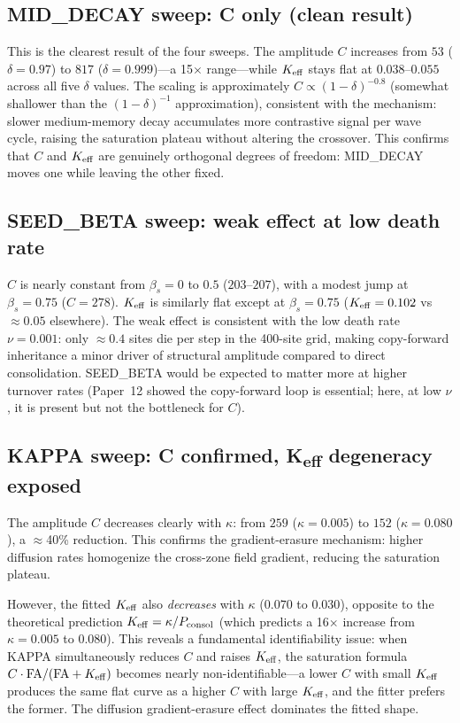 \documentclass[11pt,a4paper]{article}
\begin{document}
\subsection{MID\_DECAY sweep: C only (clean result)}

This is the clearest result of the four sweeps.  The amplitude $C$ increases
from $53$ ($\delta=0.97$) to $817$ ($\delta=0.999$)---a 15$\times$ range---while
$K_{\rm eff}$ stays flat at $0.038$--$0.055$ across all five $\delta$ values.
The scaling is approximately $C\propto(1-\delta)^{-0.8}$ (somewhat shallower than
the $(1-\delta)^{-1}$ approximation), consistent with the mechanism: slower
medium-memory decay accumulates more contrastive signal per wave cycle, raising the
saturation plateau without altering the crossover.  This confirms that $C$ and
$K_{\rm eff}$ are genuinely orthogonal degrees of freedom: MID\_DECAY moves one
while leaving the other fixed.

\subsection{SEED\_BETA sweep: weak effect at low death rate}

$C$ is nearly constant from $\beta_s=0$ to $0.5$ ($203$--$207$), with a modest
jump at $\beta_s=0.75$ ($C=278$).  $K_{\rm eff}$ is similarly flat except at
$\beta_s=0.75$ ($K_{\rm eff}=0.102$ vs $\approx0.05$ elsewhere).  The weak effect
is consistent with the low death rate $\nu=0.001$: only $\approx0.4$ sites die per
step in the 400-site grid, making copy-forward inheritance a minor driver of
structural amplitude compared to direct consolidation.  SEED\_BETA would be expected
to matter more at higher turnover rates (Paper~12 showed the copy-forward loop is
essential; here, at low $\nu$, it is present but not the bottleneck for $C$).

\subsection{KAPPA sweep: C confirmed, K\textsubscript{eff} degeneracy exposed}

The amplitude $C$ decreases clearly with $\kappa$: from $259$ ($\kappa=0.005$) to
$152$ ($\kappa=0.080$), a $\approx$40\% reduction.  This confirms the gradient-erasure
mechanism: higher diffusion rates homogenize the cross-zone field gradient, reducing
the saturation plateau.

However, the fitted $K_{\rm eff}$ also \emph{decreases} with $\kappa$ ($0.070$ to
$0.030$), opposite to the theoretical prediction $K_{\rm eff}=\kappa/P_{\rm consol}$
(which predicts a 16$\times$ increase from $\kappa=0.005$ to $0.080$).  This reveals
a fundamental identifiability issue: when KAPPA simultaneously reduces $C$ and raises
$K_{\rm eff}$, the saturation formula $C\cdot\mathrm{FA}/(\mathrm{FA}+K_{\rm eff})$
becomes nearly non-identifiable---a lower $C$ with small $K_{\rm eff}$ produces the
same flat curve as a higher $C$ with large $K_{\rm eff}$, and the fitter prefers the
former.  The diffusion gradient-erasure effect dominates the fitted shape.
\end{document}
